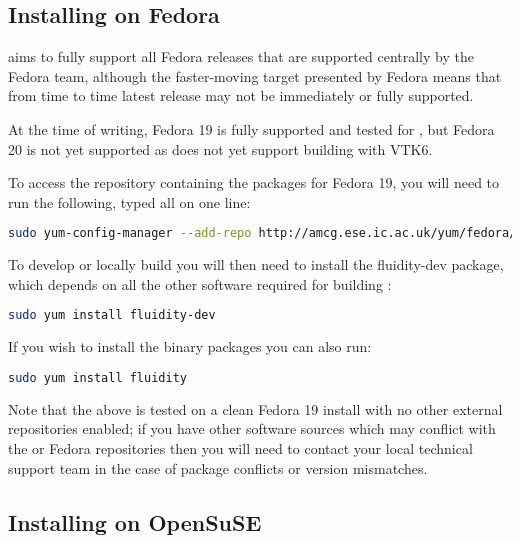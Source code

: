 \subsection{Installing on Fedora}
\label{sec:required_libraries_fedora}

\fluidity aims to fully support all Fedora releases that are supported
centrally by the Fedora team, although the faster-moving target presented by
Fedora means that from time to time latest release may not be immediately or
fully supported.

At the time of writing, Fedora 19 is fully supported and tested for \fluidity,
but Fedora 20 is not yet supported as \fluidity does not yet support building
with VTK6.

To access the repository containing the \fluidity packages for Fedora 19, you
will need to run the following, typed all on one line:

\begin{lstlisting}[language=bash]
sudo yum-config-manager --add-repo http://amcg.ese.ic.ac.uk/yum/fedora/19/fluidity.repo
\end{lstlisting}

To develop or locally build \fluidity you will then need to install the
fluidity-dev package, which depends on all the other software required for
building \fluidity:

\begin{lstlisting}[language=bash]
sudo yum install fluidity-dev
\end{lstlisting}

If you wish to install the \fluidity binary packages you can also run:

\begin{lstlisting}[language=bash]
sudo yum install fluidity
\end{lstlisting}

Note that the above is tested on a clean Fedora 19 install with no other
external repositories enabled; if you have other software sources which may
conflict with the \fluidity or Fedora repositories then you will need to
contact your local technical support team in the case of package conflicts or
version mismatches.

\subsection{Installing on OpenSuSE}
\label{sec:required_libraries_opensuse}

